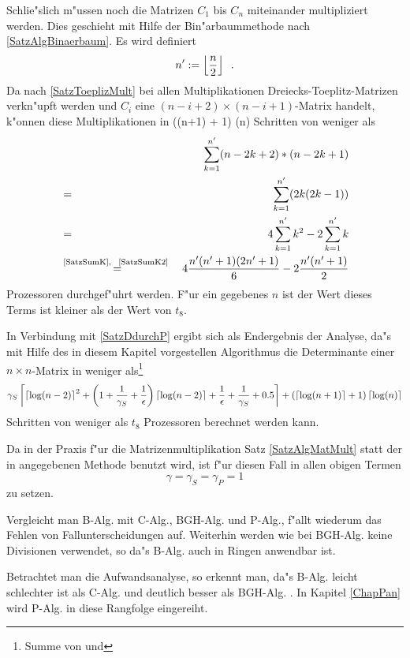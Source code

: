 Schlie"slich m"ussen noch die Matrizen $C_1$ bis $C_n$ miteinander
multipliziert werden. Dies geschieht mit Hilfe der Bin"arbaummethode
nach \ref{SatzAlgBinaerbaum}. Es wird definiert
\[ n':= \left\lfloor \frac{n}{2} \right\rfloor \mbox{\hspace{0.5em}.} \]
Da nach \ref{SatzToeplizMult}
bei allen Multiplikationen Dreiecks-Toeplitz-Matrizen verkn"upft werden
und $C_i$ eine $(n-i+2) \times (n-i+1)$-Matrix handelt, k"onnen diese
Multiplikationen in
   (\lc \log(n+1) \rc + 1) \lc \log(n) \rc
\Eeq Schritten von weniger als
\begin{eqnarray*}
    & & \sum_{k=1}^{n'} (n-2k+2) * (n-2k+1) \\
    & = & \sum_{k=1}^{n'} (2k(2k-1)) \\
    & = & 4 \sum_{k=1}^{n'} k^2 - 2 \sum_{k=1}^{n'} k \\
    & \stackrel{ \mbox{\scriptsize\rm \ref{SatzSumK}, \, \ref{SatzSumK2} } }{  =  } & 
        4 \frac{n'(n'+1)(2n'+1)}{6} - 2\frac{n'(n'+1)}{2}
\end{eqnarray*}
Prozessoren durchgef"uhrt werden. F"ur ein gegebenes $n$ ist
der Wert dieses Terms ist kleiner als
der Wert von $t_8$.

In Verbindung mit \ref{SatzDdurchP}
ergibt sich als Endergebnis der Analyse, da"s mit Hilfe des in diesem 
Kapitel vorgestellen Algorithmus die Determinante einer $n \times n$-Matrix
in weniger als\footnote{Summe von  und
 }
\[
   \gamma_S
   \left\lceil
       \left\lceil \log(n-2) \right\rceil^2 
       + \left( 1 + \frac{1}{\gamma_S}
       + \frac{1}{\epsilon} \right) \left\lceil \log(n-2) \right\rceil + 
       \frac{1}{\epsilon} + \frac{1}{\gamma_S} + 0.5
   \right\rceil +
   (\left\lceil \log(n+1) \right\rceil + 1) \left\lceil \log(n) \right\rceil
\]
Schritten von weniger als $t_8$ Prozessoren berechnet werden kann.

Da in der Praxis f"ur die Matrizenmultiplikation Satz 
\ref{SatzAlgMatMult} statt der in \cite{CW90} angegebenen Methode 
benutzt wird, ist f"ur diesen Fall in allen obigen Termen
\[ \gamma = \gamma_S = \gamma_P = 1 \] zu setzen.

Vergleicht man B-Alg. mit C-Alg., BGH-Alg. und P-Alg., f"allt wiederum
das Fehlen von Fallunterscheidungen auf. Weiterhin werden wie bei BGH-Alg.
keine Divisionen verwendet, so da"s B-Alg. auch in Ringen anwendbar ist.

Betrachtet man die Aufwandsanalyse, so erkennt man, da"s B-Alg. 
leicht schlechter ist als C-Alg. und deutlich besser als BGH-Alg. .
In Kapitel \ref{ChapPan} wird P-Alg. in diese Rangfolge eingereiht.

